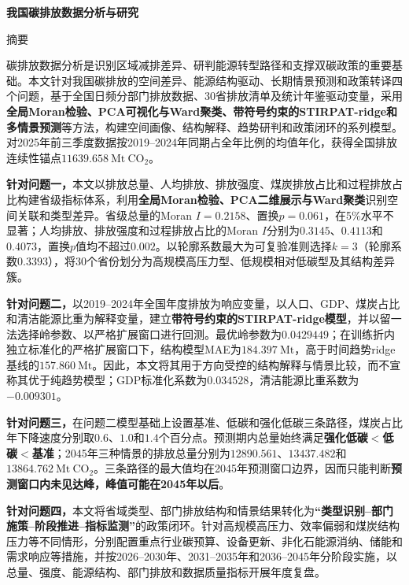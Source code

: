 \documentclass[12pt,a4paper]{ctexart}
\theoremstyle{definition}
\theoremstyle{plain}
\theoremstyle{remark}
\renewenvironment{abstract}
  {\begin{center}\heiti\zihao{-3}摘\quad 要\end{center}\zihao{-4}\songti}
  {\par\vspace{1em}}
\begin{document}
\pagestyle{plain}
\setcounter{page}{1}
\begin{center}
{\heiti\bfseries 我国碳排放数据分析与研究}
\end{center}

\begin{abstract}
\noindent\hspace*{2em}碳排放数据分析是识别区域减排差异、研判能源转型路径和支撑双碳政策的重要基础。本文针对我国碳排放的空间差异、能源结构驱动、长期情景预测和政策转译四个问题，基于全国日频分部门排放数据、30省排放清单及统计年鉴驱动变量，采用\textbf{全局Moran检验、PCA可视化与Ward聚类、带符号约束的STIRPAT-ridge和多情景预测}等方法，构建空间画像、结构解释、趋势研判和政策闭环的系列模型。对2025年前三季度数据按2019--2024年同期占全年比例的均值年化，获得全国排放连续性锚点$11639.658\ \mathrm{Mt\ CO_2}$。

\textbf{针对问题一，}本文以排放总量、人均排放、排放强度、煤炭排放占比和过程排放占比构建省级指标体系，利用\textbf{全局Moran检验、PCA二维展示与Ward聚类}识别空间关联和类型差异。省级总量的Moran $I=0.2158$、置换$p=0.061$，在5\%水平不显著；人均排放、排放强度和过程排放占比的Moran $I$分别为$0.3145$、$0.4113$和$0.4073$，置换$p$值均不超过$0.002$。以轮廓系数最大为可复验准则选择$k=3$（轮廓系数$0.3393$），将30个省份划分为高规模高压力型、低规模相对低碳型及其结构差异簇。

\textbf{针对问题二，}以2019--2024年全国年度排放为响应变量，以人口、GDP、煤炭占比和清洁能源比重为解释变量，建立\textbf{带符号约束的STIRPAT-ridge模型}，并以留一法选择岭参数、以严格扩展窗口进行回测。最优岭参数为$0.0429449$；在训练折内独立标准化的严格扩展窗口下，结构模型MAE为$184.397\ \mathrm{Mt}$，高于时间趋势ridge基线的$157.860\ \mathrm{Mt}$。因此，本文将其用于方向受控的结构解释与情景比较，而不宣称其优于纯趋势模型；GDP标准化系数为$0.034528$，清洁能源比重系数为$-0.009301$。

\textbf{针对问题三，}在问题二模型基础上设置基准、低碳和强化低碳三条路径，煤炭占比年下降速度分别取$0.6$、$1.0$和$1.4$个百分点。预测期内总量始终满足\textbf{强化低碳$<$低碳$<$基准}；2045年三种情景的排放总量分别为$12890.561$、$13437.482$和$13864.762\ \mathrm{Mt\ CO_2}$。三条路径的最大值均在2045年预测窗口边界，因而只能判断\textbf{预测窗口内未见达峰，峰值可能在2045年以后}。

\textbf{针对问题四，}本文将省域类型、部门排放结构和情景结果转化为\textbf{“类型识别--部门施策--阶段推进--指标监测”}的政策闭环。针对高规模高压力、效率偏弱和煤炭结构压力等不同情形，分别配置重点行业碳预算、设备更新、非化石能源消纳、储能和需求响应等措施，并按2026--2030年、2031--2035年和2036--2045年分阶段实施，以总量、强度、能源结构、部门排放和数据质量指标开展年度复盘。
\end{abstract}
\end{document}
